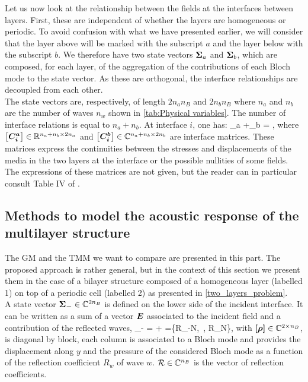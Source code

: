 Let us now look at the relationship between the fields at the interfaces between layers. First, these are independent of whether the layers are homogeneous or periodic. To avoid confusion with what we have presented earlier, we will consider that the layer above will be marked with the subscript $a$ and the layer below with the subscript $b$. We therefore have two state vectors $\boldsymbol{\Sigma}_a$ and $\boldsymbol{\Sigma}_b$, which are composed, for each layer, of the aggregation of the contributions of each Bloch mode to the state vector. As these are orthogonal, the interface relationships are decoupled from each other.\\


The state vectors are, respectively, of length $2n_an_B$ and $2n_bn_B$ where $n_a$ and $n_b$ are the number of waves $n_w$ shown in \cref{tab:Physical variables}. The number of interface relations is equal to $n_a+n_b$. At interface $i$, one has:
\be
{}\vc{\Sigma}_a +\vc{\Sigma}_b = ,
\ee
where $\boldsymbol{\left[C^a_i\right]}\in\mathbb{R}^{n_a+n_b\times 2n_a}$ and $\boldsymbol{\left[C^b_i\right]}\in\mathbb{C}^{n_a+n_b\times 2n_b}$ are interface matrices. These matrices express the continuities between the stresses and displacements of the media in the two layers at the interface or the possible nullities of some fields. The expressions of these matrices are not given, but the reader can in particular consult Table IV of \cite{dazel2013}.

\subsection[Methods to model the acoustic response of the multilayer structure]
    {\texorpdfstring{Methods to model the acoustic response of the\\ multilayer structure}
    {Methods to model the acoustic response of the multilayer structure}}
\label{sec:multilayer_response}

The GM and the TMM we want to compare are presented in this part. The proposed approach is rather general, but in the context of this section we present them in the case of a bilayer structure composed of a homogeneous layer (labelled 1) on top of a periodic cell (labelled 2) as presented in \cref{two_layers_problem}. \\ 

A state vector $\boldsymbol{\Sigma_-}\in\mathbb{C}^{2n_B}$ is defined on the lower side of the incident interface. It can be written as a sum of a vector $\boldsymbol{E}$ associated to the incident field and a contribution of the reflected waves,
\be 
\vc{\Sigma}_- = \mat{\rho}+ \esp {}=\{R_{-N},\hdots \, , R_N\},
\ee
with $\boldsymbol{\left[\rho\right]}\in\mathbb{C}^{2\times n_B}$, is diagonal by block, each column is associated to a Bloch mode and provides the displacement along $y$ and the pressure of the considered Bloch mode as a function of the reflection coefficient $R_w$ of wave $w$. $\mathcal{R}\in\mathbb{C}^{n_B}$ is the vector of reflection coefficients.\\


